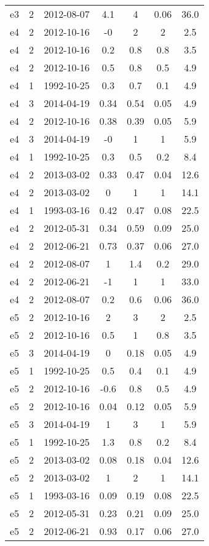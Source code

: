 \begin{table*}[htp]
\begin{tabular}{ccccccc}
e3 & 2 & 2012-08-07 & 4.1 & 4 & 0.06 & 36.0 \\
e4 & 2 & 2012-10-16 & -0 & 2 & 2 & 2.5 \\
e4 & 2 & 2012-10-16 & 0.2 & 0.8 & 0.8 & 3.5 \\
e4 & 2 & 2012-10-16 & 0.5 & 0.8 & 0.5 & 4.9 \\
e4 & 1 & 1992-10-25 & 0.3 & 0.7 & 0.1 & 4.9 \\
e4 & 3 & 2014-04-19 & 0.34 & 0.54 & 0.05 & 4.9 \\
e4 & 2 & 2012-10-16 & 0.38 & 0.39 & 0.05 & 5.9 \\
e4 & 3 & 2014-04-19 & -0 & 1 & 1 & 5.9 \\
e4 & 1 & 1992-10-25 & 0.3 & 0.5 & 0.2 & 8.4 \\
e4 & 2 & 2013-03-02 & 0.33 & 0.47 & 0.04 & 12.6 \\
e4 & 2 & 2013-03-02 & 0 & 1 & 1 & 14.1 \\
e4 & 1 & 1993-03-16 & 0.42 & 0.47 & 0.08 & 22.5 \\
e4 & 2 & 2012-05-31 & 0.34 & 0.59 & 0.09 & 25.0 \\
e4 & 2 & 2012-06-21 & 0.73 & 0.37 & 0.06 & 27.0 \\
e4 & 2 & 2012-08-07 & 1 & 1.4 & 0.2 & 29.0 \\
e4 & 2 & 2012-06-21 & -1 & 1 & 1 & 33.0 \\
e4 & 2 & 2012-08-07 & 0.2 & 0.6 & 0.06 & 36.0 \\
e5 & 2 & 2012-10-16 & 2 & 3 & 2 & 2.5 \\
e5 & 2 & 2012-10-16 & 0.5 & 1 & 0.8 & 3.5 \\
e5 & 3 & 2014-04-19 & 0 & 0.18 & 0.05 & 4.9 \\
e5 & 1 & 1992-10-25 & 0.5 & 0.4 & 0.1 & 4.9 \\
e5 & 2 & 2012-10-16 & -0.6 & 0.8 & 0.5 & 4.9 \\
e5 & 2 & 2012-10-16 & 0.04 & 0.12 & 0.05 & 5.9 \\
e5 & 3 & 2014-04-19 & 1 & 3 & 1 & 5.9 \\
e5 & 1 & 1992-10-25 & 1.3 & 0.8 & 0.2 & 8.4 \\
e5 & 2 & 2013-03-02 & 0.08 & 0.18 & 0.04 & 12.6 \\
e5 & 2 & 2013-03-02 & 1 & 2 & 1 & 14.1 \\
e5 & 1 & 1993-03-16 & 0.09 & 0.19 & 0.08 & 22.5 \\
e5 & 2 & 2012-05-31 & 0.23 & 0.21 & 0.09 & 25.0 \\
e5 & 2 & 2012-06-21 & 0.93 & 0.17 & 0.06 & 27.0 \\

\end{tabular}
\end{table*}
